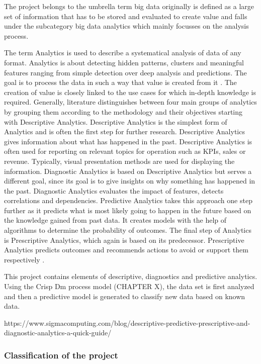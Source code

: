 The project belongs to the umbrella term big data originally is defined as a large set of information
that has to be stored and evaluated to create value and falls under the subcategory big data analytics 
which mainly focusses on the analysis process. 

The term Analytics is used to describe a systematical analysis of data of any format. Analytics is 
about detecting hidden patterns, clusters and meaningful features ranging from simple detection 
over deep analysis and predictions. The goal is to process the data in such a way that value is 
created from it \cite[p.2]{Tanwar2015} \cite[p.8f]{Meier_2021}. The creation of value is closely linked to 
the use cases for which in-depth knowledge is required. Generally, literature distinguishes 
between four main groups of analytics by grouping them according to the methodology 
and their objectives starting with Descriptive Analytics. Descriptive Analytics is the simplest 
form of Analytics and is often the first step for further research. Descriptive Analytics gives 
information about what has happened in the past. Descriptive Analytics is often used for reporting 
on relevant topics for operation such as KPIs, sales or revenue. Typically, visual presentation 
methods are used for displaying the information. Diagnostic Analytics is based on Descriptive 
Analytics but serves a different goal, since its goal is to give insights on why something has 
happened in the past. Diagnostic Analytics evaluates the impact of features, detects correlations 
and dependencies. Predictive Analytics takes this approach one step further as it predicts what 
is most likely going to happen in the future based on the knowledge gained from past data. It 
creates models with the help of algorithms to determine the probability of outcomes. The final 
step of Analytics is Prescriptive Analytics, which again is based on its predecessor. Prescriptive 
Analytics predicts outcomes and recommends actions to avoid or support them respectively \cite[p.8f]{Meier_2021}.

This project contains elements of descriptive, diagnostics and predictive analytics. Using the 
Crisp Dm process model (CHAPTER X), the data set is first analyzed and then a predictive model 
is generated to classify new data based on known data.

https://www.sigmacomputing.com/blog/descriptive-predictive-prescriptive-and-diagnostic-analytics-a-quick-guide/

\subsubsection{Classification of the project}

